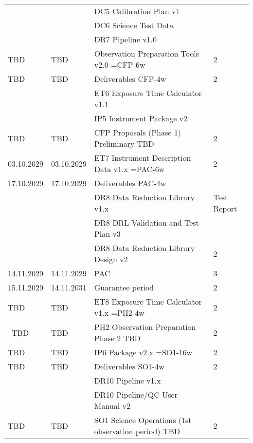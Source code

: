\begin{table}
\begin{tabularx}{\textwidth}{llll}
           &               &	DC5 Calibration Plan v1					    &	\\
           &               &	DC6 Science Test Data                                       &	\\
 	   &		   &	DR7 Pipeline v1.0					    &	\\
\hline
TBD        &	TBD	   &	Observation Preparation Tools v2.0  =CFP-6w     	    &	2 \\
\hline
TBD	   &	TBD	   &	Deliverables CFP-4w                                         &	2 \\
           &               &    ET6 Exposure Time Calculator v1.1			    &	\\
	   &		   &	IP5 Instrument Package v2				    &	\\
\hline
TBD	   &	TBD	   &	CFP Proposals (Phase 1) Preliminary  TBD		    &	2 \\
\hline
03.10.2029 &	03.10.2029 &	ET7 Instrument Description Data v1.x =PAC-6w		    &	2 \\
\hline
17.10.2029 &	17.10.2029 &	Deliverables PAC-4w                                         &	\\
   	   &               &    DR8 Data Reduction Library v1.x & Test Report               &	\\
           &               &    DR8 DRL Validation and Test Plan v3                         &	\\
           &               &    DR8 Data Reduction Library Design v2			    &	2 \\
\hline
14.11.2029 &	14.11.2029 &	PAC							    &	3 \\
\hline
15.11.2029 &	14.11.2031 &	Guarantee period 					    &	2 \\
\hline
TBD        &	TBD        &	ET8 Exposure Time Calculator v1.x =PH2-4w		    &	2 \\
\
TBD        &	TBD        &	PH2 Observation Preparation Phase 2 TBD			    &	2 \\
\hline
TBD        &	TBD        &	IP6 Package v2.x =SO1-16w				    &	2 \\
\hline
TBD        &	TBD        &	Deliverables SO1-4w                                         &	2 \\
           &               &    DR10 Pipeline v1.x					    &	\\
           &		   &	DR10 Pipeline/QC User Manual v2				    &	\\
\hline
TBD        &	TBD        &	SO1 Science Operations (1st observation period) TBD	    &	2 \\

\end{tabularx}
\end{table}
